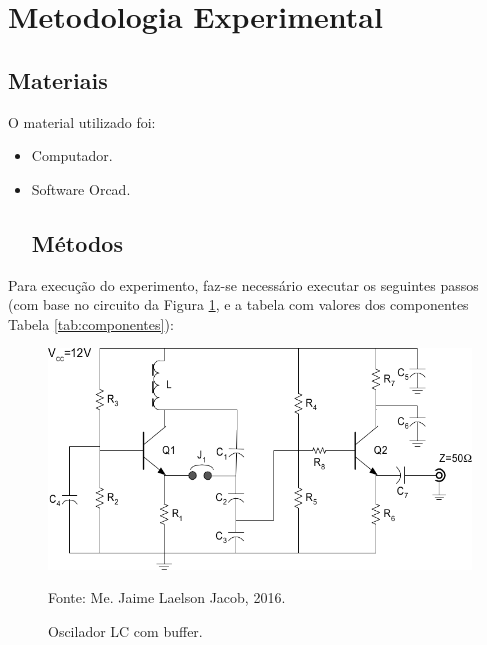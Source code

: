 \newpage
\section{Metodologia Experimental}

\subsection{Materiais}
O material utilizado foi:
\begin{itemize}
\item Computador.
\item Software Orcad.

\subsection{Métodos}
\end{itemize}
Para execução do experimento, faz-se necessário executar os seguintes passos (com base no circuito da Figura \ref{f_sch}, e a tabela com valores dos componentes Tabela \ref{tab:componentes}):

\begin{figure}[H]
    \centering
        \caption{Oscilador LC com buffer.}\label{f_sch}
    \includegraphics[scale=0.3]{Imagens/sch.png}

    \small Fonte: Me. Jaime Laelson Jacob, 2016.
\end{figure}

